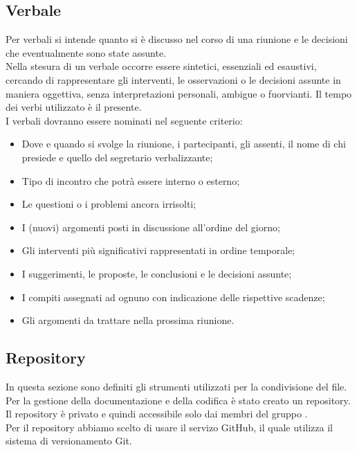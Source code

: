 	\subsection{Verbale}
Per verbali si intende quanto si è discusso nel corso di una riunione e le decisioni che eventualmente sono state assunte. \\
Nella stesura di un verbale occorre essere sintetici, essenziali ed esaustivi, cercando di rappresentare gli interventi, le osservazioni o le decisioni assunte in maniera oggettiva, senza interpretazioni personali, ambigue o fuorvianti. Il tempo dei verbi utilizzato è il presente.\\
I verbali dovranno essere nominati nel seguente criterio: 
\begin{itemize}
	\item Dove e quando si svolge la riunione, i partecipanti, gli assenti, il nome di chi presiede e quello del segretario verbalizzante;
	\item Tipo di incontro che potrà essere interno o esterno;
	\item Le questioni o i problemi ancora irrisolti;
	\item I (nuovi) argomenti posti in discussione all'ordine del giorno;
	\item Gli interventi più significativi rappresentati in ordine temporale; 
	\item I suggerimenti, le proposte, le conclusioni e le decisioni assunte; 
	\item I compiti assegnati ad ognuno con indicazione delle rispettive scadenze; 
	\item Gli argomenti da trattare nella prossima riunione. 
\end{itemize}

	\subsection{Repository}
In questa sezione sono definiti gli strumenti utilizzati per la condivisione del file. \\
Per la gestione della documentazione e della codifica è stato creato un \gls{repository}. Il \gls{repository} è privato e quindi accessibile solo dai membri del gruppo \GRUPPO.\\
Per il \gls{repository} abbiamo scelto di usare il servizo \gls{GitHub}, il quale utilizza il sistema di versionamento \gls{Git}.
